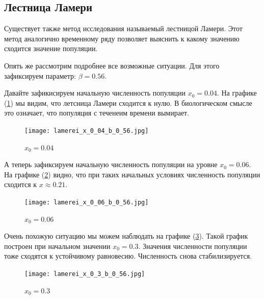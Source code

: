         \subsection{Лестница Ламери}
    
            Существует также метод исследования называемый лестницой Ламери. Этот метод аналогично временному ряду позволяет выяснить к какому значению сходится значение популяции.
            
            Опять же рассмотрим подробнее все возможные ситуации. Для этого зафиксируем параметр: \(\beta = 0.56\). 
    
            Давайте зафикисируем начальную численность популяции \(x_0 = 0.04\). На графике (\ref{lamerei_x_0_04_b_0_56}) мы видим, что летсница Ламери сходится к нулю. В биологическом смысле это означает, что популяция с теченеим времени вымирает.
    
            \begin{figure}
                \centering
                \texttt{[image: lamerei\_x\_0\_04\_b\_0\_56.jpg]}
    
                \captionsetup{justification=centering}
                \caption{\(x_0 = 0.04\)}
                \label{lamerei_x_0_04_b_0_56}
            \end{figure}
    
            А теперь зафиксируем начальную численность популяции на уровне \(x_0 = 0.06\). На графике (\ref{lamerei_x_0_06_b_0_56}) видно, что при таких начальных условиях численность популяции сходится к \(x \approx 0.21\).
            
            \begin{figure}
                \centering
                \texttt{[image: lamerei\_x\_0\_06\_b\_0\_56.jpg]}
    
                \captionsetup{justification=centering}
                \caption{\(x_0 = 0.06\)}
                \label{lamerei_x_0_06_b_0_56}
            \end{figure}
    
            Очень похожую ситуацию мы можем наблюдать на графике (\ref{lamerei_x_0_3_b_0_56}). Такой график построен при начальном значении \(x_0 = 0.3\). Значения численности популяции тоже сходятся к устойчивому равновесию. Численность снова стабилизируется.
            
            \begin{figure}
                \centering
                \texttt{[image: lamerei\_x\_0\_3\_b\_0\_56.jpg]}
    
                \captionsetup{justification=centering}
                \caption{\(x_0 = 0.3\)}
                \label{lamerei_x_0_3_b_0_56}
            \end{figure}
    
